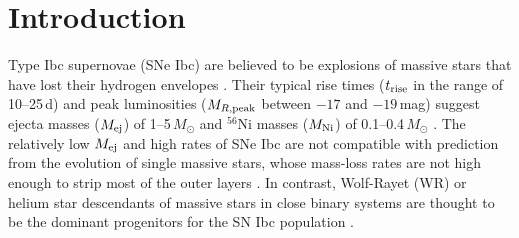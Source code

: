 \documentclass[twocolumn]{aastex63}
\begin{document}


\vspace{1em}

\section{Introduction}
Type Ibc supernovae (SNe Ibc) are believed to be explosions of massive stars that have lost their 
hydrogen envelopes \citep{Filippenko1997, GalYam2017}. Their typical rise times ($t_{\rm rise}$ in the 
range of 10--25\,d) and peak luminosities ($M_{R\rm , peak}$ between $-17$ and $-19$\,mag) 
suggest ejecta masses ($M_{\rm ej}$) of 1--5\,$M_\odot$ and $^{56}$Ni masses ($M_{\rm Ni}$) of 
0.1--0.4\,$M_\odot$ \citep{Drout2011, Taddia2018, Prentice2019}. The relatively low $M_{\rm ej}$ and 
high rates of SNe Ibc are not compatible with prediction from the evolution of single massive stars, 
whose mass-loss rates are not high enough to strip most of the outer layers \citep{Smith2011, 
Lyman2016}. In contrast, Wolf-Rayet (WR) or helium star descendants of massive stars in close binary 
systems are thought to be the dominant progenitors for the SN Ibc population \citep{Dessart2012, 
Eldridge2013}. 
\end{document}

